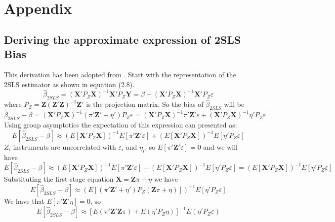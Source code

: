 \appendix
\section{Appendix}
\subsection{Deriving the approximate expression of 2SLS Bias}
This derivation has been adopted from \cite{results}. Start with the representation of the 2SLS estimator as shown in equation (2.8).
\begin{equation}
\hat{\beta }_{2SLS}=(\textbf{X}'P_{Z}\textbf{X})^{-1}\textbf{X}'P_{Z}\textbf{Y}=\beta+(\textbf{X}'P_{Z}\textbf{X})^{-1}\textbf{X}'P_{Z}\varepsilon
\end{equation}
where $P_{Z}=\textbf{Z}(\textbf{Z}'\textbf{Z})^{-1}\textbf{Z}'$ is the projection matrix.
So the bias of $\hat{\beta }_{2SLS}$ will be
\begin{equation}
\hat{\beta }_{2SLS}-\beta = (\textbf{X}'P_{Z}\textbf{X})^{-1}(\pi'\textbf{Z}'+\eta')P_{Z}\varepsilon
                          = (\textbf{X}'P_{Z}\textbf{X})^{-1}\pi'\textbf{Z}'\varepsilon +(\textbf{X}'P_{Z}\textbf{X})^{-1}\eta' P_{Z}\varepsilon
\end{equation}
Using group asymptotics the expectation of this expression can presented as:
\begin{equation}
    E[\hat{\beta }_{2SLS}-\beta ]\approx (E[{\textbf{X}}'P_{Z}\textbf{X}])^{-1}E[{\pi}'{\textbf{Z}}'\varepsilon ]+(E[{\textbf{X}}'P_{Z}\textbf{X}])^{-1}E[{\eta }'P_{Z}\varepsilon ]
\end{equation}
$Z_{i}$ instruments are uncorrelated with $\varepsilon_{i}$ and $\eta_{i}$, so $E[{\pi }'{\textbf{Z}}'\varepsilon ]=0 $ and we will have
\begin{equation}
    E[\hat{\beta }_{2SLS}-\beta ]\approx (E[{\textbf{X}}'P_{Z}\textbf{X}])^{-1}E[{\pi}'{\textbf{Z}}'\varepsilon ]+(E[{\textbf{X}}'P_{Z}\textbf{X}])^{-1}E[{\eta }'P_{Z}\varepsilon ]=(E[{\textbf{X}}'P_{Z}\textbf{X}])^{-1}E[{\eta }'P_{Z}\varepsilon]
\end{equation}
Substituting the first stage equation $\textbf{X}=\textbf{Z}\pi +\eta$ we have
\begin{equation}
E[\hat{\beta }_{2SLS}-\beta ]\approx (E[({\pi }'{\textbf{Z}}'+{\eta }')P_{Z}(\textbf{Z}\pi +\eta )])^{-1}E[{\eta }'P_{Z}\varepsilon ]
\end{equation}
We have that $E[{\pi }'{\textbf{Z}}'\eta ]=0 $, so
\begin{equation}
    E[\hat{\beta }_{2SLS}-\beta ]\approx[E({\pi }'{\textbf{Z}}'\textbf{Z}\pi )+E({\eta }'P_{Z}\eta )]^{-1}E({\eta }'P_{Z}\varepsilon )
\end{equation}
